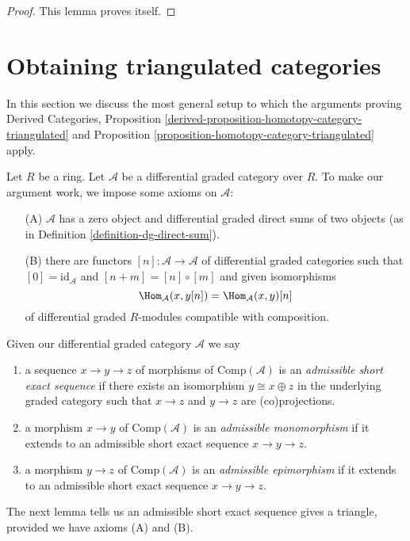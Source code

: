 \begin{proof}
This lemma proves itself.
\end{proof}









\section{Obtaining triangulated categories}
\label{section-review}

\noindent
In this section we discuss the most general setup to which the arguments
proving Derived Categories, Proposition
\ref{derived-proposition-homotopy-category-triangulated} and
Proposition \ref{proposition-homotopy-category-triangulated} apply.

\medskip\noindent
Let $R$ be a ring. Let $\mathcal{A}$ be a differential graded category
over $R$. To make our argument work, we impose some axioms on $\mathcal{A}$:
\begin{enumerate}
\item[(A)] $\mathcal{A}$ has a zero object and differential
graded direct sums of two objects
(as in Definition \ref{definition-dg-direct-sum}).
\item[(B)] there are functors $[n] : \mathcal{A} \longrightarrow \mathcal{A}$
of differential graded categories such that
$[0] = \text{id}_\mathcal{A}$ and $[n + m] = [n] \circ [m]$
and given isomorphisms
$$
\Hom_\mathcal{A}(x, y[n]) = \Hom_\mathcal{A}(x, y)[n]
$$
of differential graded $R$-modules compatible with composition.
\end{enumerate}

\noindent
Given our differential graded category $\mathcal{A}$ we say
\begin{enumerate}
\item a sequence $x \to y \to z$ of morphisms of $\text{Comp}(\mathcal{A})$
is an {\it admissible short exact sequence} if there exists
an isomorphism $y \cong x \oplus z$ in the underlying graded category
such that $x \to z$ and $y \to z$ are (co)projections.
\item a morphism $x\to y$ of $\text{Comp}(\mathcal{A})$ is an
{\it admissible monomorphism} if it extends to an
admissible short exact sequence $x\to y\to z$.
\item a morphism $y\to z$ of $\text{Comp}(\mathcal{A})$ is an
{\it admissible epimorphism} if it extends to an
admissible short exact sequence $x\to y\to z$.
\end{enumerate}
The next lemma tells us an admissible short exact sequence gives a
triangle, provided we have axioms (A) and (B).

